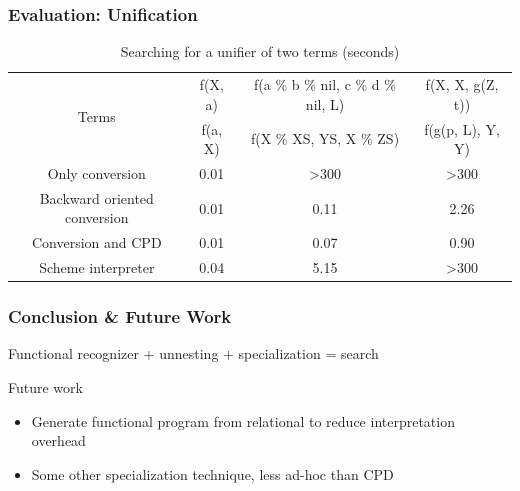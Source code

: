 \documentclass[xcolor=table]{beamer}
\begin{document}
\begin{frame}[fragile]
  \transwipe[direction=90]
  \frametitle{Evaluation: Unification}
\begin{table}
\tiny
\centering
\begin{tabular}{c|c|c|c}
\multirow{ 2}{*}{Terms} &
f(X, a) & f(a \% b \% nil, c \% d \% nil, L) & f(X, X, g(Z, t))  \\
\cline{2-4} &
f(a, X) & f(X \% XS, YS, X \% ZS) & f(g(p, L), Y, Y)  \\
\hline\hline
Only conversion               & 0.01  &  >300 & >300 \\
\hline
Backward oriented conversion  & 0.01  &  0.11 & 2.26  \\
\hline
Conversion and CPD            & 0.01  &  0.07 & 0.90  \\
\hline

Scheme interpreter            & 0.04  & 5.15 & >300   \\
\end{tabular}
 \caption{Searching for a unifier of two terms (seconds)}
    \label{tab:uni}
\end{table}
\end{frame}

\begin{frame}[fragile]
  \transwipe[direction=90]
  \frametitle{Conclusion \& Future Work}
\begin{center}
Functional recognizer + unnesting + specialization = search
\end{center}

\vspace{15pt}

Future work

\begin{itemize}
  \item Generate functional program from relational to reduce interpretation overhead
  \item Some other specialization technique, less ad-hoc than CPD

\end{itemize}
\end{frame}
\end{document}
